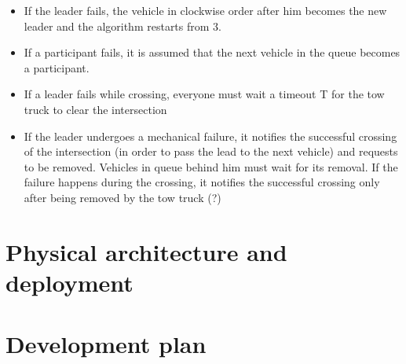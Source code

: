 \documentclass{memoir}
\begin{document}
\begin{itemize}
	\item If the leader fails, the vehicle in clockwise order after him becomes the new leader and the algorithm restarts from 3.
	\item If a participant fails, it is assumed that the next vehicle in the queue becomes a participant.
	\item If a leader fails while crossing, everyone must wait a timeout T for the tow truck to clear the intersection
	\item If the leader undergoes a mechanical failure, it notifies the successful crossing of the intersection (in order to pass the lead to the next vehicle) and requests to be removed. Vehicles in queue behind him must wait for its removal. If the failure happens during the crossing, it notifies the successful crossing only after being removed by the tow truck (?)
\end{itemize}

\section{Physical architecture and deployment}

\section{Development plan}











\end{document}
